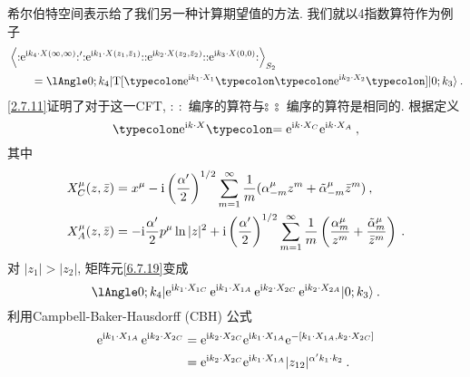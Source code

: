 希尔伯特空间表示给了我们另一种计算期望值的方法. 我们就以4指数算符作为例子
	\begin{align}
		&\left\langle : \mathrel{ \me^{\mi k_{4} \cdot X(\infty, \infty)} }:^{\prime} 
		:\mathrel{ \me^{\mi k_{1} \cdot X(z_{1}, \bar{z}_{1})} }: 
		:\mathrel{ \me^{\mi k_{2} \cdot X(z_{2}, \bar{z}_{2})} }: 
		:\mathrel{ \me^{\mi k_{3} \cdot X(0,0)} }: \right\rangle_{S_{2}} \nonumber \\
		&\qquad =\lAngle 0 ; k_{4}|\mathrm{T}[\mathrel{  \typecolon \me^{\mi k_{1} \cdot X_{1}}\typecolon }
		\mathrel{\typecolon\me^{\mi k_{2} \cdot X_{2} }  \typecolon} ]| 0 ; k_{3}\rangle \:. \label{6.7.19}
	\end{align}
\eqref{2.7.11}证明了对于这一CFT, $:\: :$ 编序的算符与$\typecolon\:\typecolon$ 编序的算符是相同的. 根据定义
\begin{equation}
  	\mathrel{\typecolon \me^{\mi k \cdot X } \typecolon }= \me^{\mi k \cdot X_{C}} \me^{\mi k \cdot X_{A}} \:, \label{6.7.20}
\end{equation}
其中
\begin{subequations} \label{6.7.21}
\begin{align}
X_{C}^{\mu}(z, \bar{z}) &= x^{\mu} - \mathrm{i}\left(\frac{\alpha^{\prime}}{2}\right)^{1 / 2} 
\sum_{m=1}^{\infty} \frac{1}{m}(\alpha_{-m}^{\mu} z^{m}+\tilde{\alpha}_{-m}^{\mu} \bar{z}^{m}) \:, \label{6.7.21a}  \\
X_{A}^{\mu}(z, \bar{z}) &= -\mathrm{i} \frac{\alpha^{\prime}}{2} p^{\mu} \ln |z|^{2} + 
\mathrm{i}\left(\frac{\alpha^{\prime}}{2}\right)^{1 / 2} \sum_{m=1}^{\infty} 
\frac{1}{m}\left(\frac{\alpha_{m}^{\mu}}{z^{m}}+\frac{\tilde{\alpha}_{m}^{\mu}}{\bar{z}^{m}}\right) \:. \label{6.7.21b}
\end{align}	
\end{subequations}
对 $|z_{1}|>|z_{2}|$, 矩阵元\eqref{6.7.19}变成
\begin{equation}
	\lAngle 0 ; k_{4} | \me^{\mi k_{1} \cdot X_{1 C}} \, \me^{\mi k_{1} \cdot X_{1 A}}\,
	 \me^{\mi k_{2} \cdot X_{2 C}}\, \me^{\mi k_{2} \cdot X_{2 A}}| 0 ; k_{3} \rangle \:. \label{6.7.22}
\end{equation}
利用Campbell-Baker-Hausdorff (CBH) 公式
\begin{align}
	\mathrm{e}^{\mathrm{i} k_{1} \cdot X_{1 A}}\, \mathrm{e}^{\mathrm{i} k_{2} \cdot X_{2 C}} &= 
	\mathrm{e}^{\mathrm{i} k_{2} \cdot X_{2 C}} \mathrm{e}^{\mathrm{i} k_{1} \cdot X_{1 A}} \mathrm{e}^{-[k_{1} \cdot X_{1 A}, k_{2} \cdot X_{2 C}]}  \nonumber \\
	&=\mathrm{e}^{\mathrm{i} k_{2} \cdot X_{2 C}} \mathrm{e}^{\mathrm{i} k_{1} \cdot X_{1 A}} |z_{12}|^{\alpha^{\prime} k_{1} \cdot k_{2}} \:. \label{6.7.23}
\end{align}
